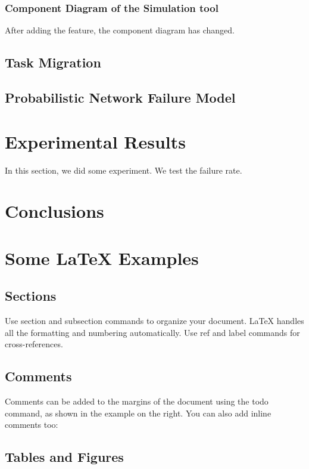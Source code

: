 \subsubsection{Component Diagram of the Simulation tool}
After adding the feature, the component diagram has changed.

\subsection{Task Migration}

\subsection{Probabilistic Network Failure Model}

\section{Experimental Results}
In this section, we did some experiment. We test the failure rate.

\section{Conclusions}


\section{Some \LaTeX{} Examples}
\label{sec:examples}

\subsection{Sections}

Use section and subsection commands to organize your document. \LaTeX{} handles all the formatting and numbering automatically. Use ref and label commands for cross-references.

\subsection{Comments}

Comments can be added to the margins of the document using the  todo command, as shown in the example on the right. You can also add inline comments too:


\subsection{Tables and Figures}

